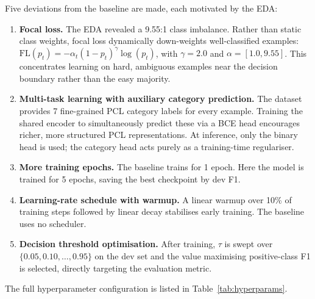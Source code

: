 \documentclass{article}
\begin{document}
Five deviations from the baseline are made, each motivated by the EDA:

\begin{enumerate}
    \item \textbf{Focal loss.} The EDA revealed a 9.55:1 class imbalance. Rather than static class weights, focal loss dynamically down-weights well-classified examples: $\text{FL}(p_t) = -\alpha_t (1 - p_t)^\gamma \log(p_t)$, with $\gamma = 2.0$ and $\alpha = [1.0, 9.55]$. This concentrates learning on hard, ambiguous examples near the decision boundary rather than the easy majority.

    \item \textbf{Multi-task learning with auxiliary category prediction.} The dataset provides 7 fine-grained PCL category labels for every example. Training the shared encoder to simultaneously predict these via a BCE head encourages richer, more structured PCL representations. At inference, only the binary head is used; the category head acts purely as a training-time regulariser.

    \item \textbf{More training epochs.} The baseline trains for 1 epoch. Here the model is trained for 5 epochs, saving the best checkpoint by dev F1.

    \item \textbf{Learning-rate schedule with warmup.} A linear warmup over 10\% of training steps followed by linear decay stabilises early training. The baseline uses no scheduler.

    \item \textbf{Decision threshold optimisation.} After training, $\tau$ is swept over $\{0.05, 0.10, \ldots, 0.95\}$ on the dev set and the value maximising positive-class F1 is selected, directly targeting the evaluation metric.
\end{enumerate}

The full hyperparameter configuration is listed in Table~\ref{tab:hyperparams}.
\end{document}
